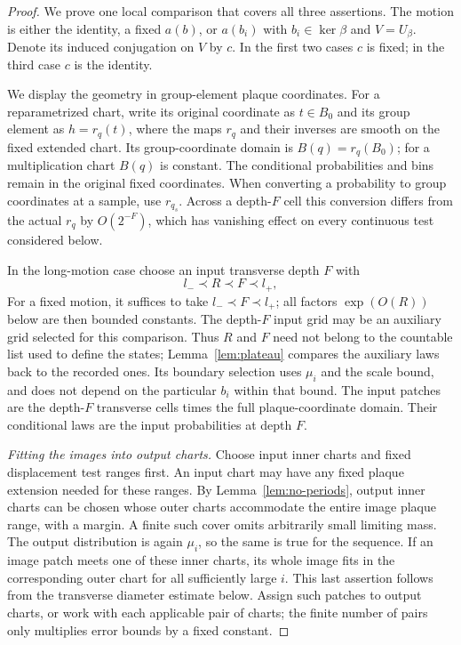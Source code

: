 \begin{proof}
We prove one local comparison that covers all three assertions. The
motion is either the identity, a fixed $a(b)$, or $a(b_i)$ with
$b_i\in\ker\beta$ and $V=U_\beta$. Denote its induced conjugation on
$V$ by $c$. In the first two cases $c$ is fixed; in the third case
$c$ is the identity.

We display the geometry in group-element plaque coordinates. For
a reparametrized chart, write its original coordinate as $t\in B_0$
and its group element as $h=r_q(t)$, where the maps $r_q$ and their
inverses are smooth on the fixed extended chart. Its group-coordinate
domain is $B(q)=r_q(B_0)$; for a multiplication chart $B(q)$ is
constant. The conditional probabilities and bins remain in the
original fixed coordinates. When converting a probability to group
coordinates at a sample, use $r_{q_s}$. Across a depth-$F$ cell this
conversion differs from the actual $r_q$ by $O(2^{-F})$, which has
vanishing effect on every continuous test considered below.

In the long-motion case choose an input
transverse depth $F$ with
\begin{equation}\label{eq:comparison-scales}
 l_-\prec R\prec F\prec l_+,
\end{equation}
For a fixed motion, it suffices to take $l_-\prec F\prec l_+$;
all factors $\exp(O(R))$ below are then bounded constants.
The depth-$F$ input grid may be an auxiliary grid selected for this
comparison. Thus $R$ and $F$ need not belong to the countable list
used to define the states; Lemma~\ref{lem:plateau} compares the
auxiliary laws back to the recorded ones. Its boundary selection
uses $\mu_i$ and the scale bound, and does not depend on the
particular $b_i$ within that bound.
The input patches are the depth-$F$ transverse cells times the full
plaque-coordinate domain. Their conditional laws are the input
probabilities at depth $F$.

\smallskip\noindent
\emph{Fitting the images into output charts.}
Choose input inner charts and fixed displacement test ranges first.
An input chart may have any fixed plaque extension needed for these
ranges. By Lemma~\ref{lem:no-periods}, output inner charts can be
chosen whose outer charts accommodate the entire image plaque
range, with a margin. A finite such cover omits arbitrarily small
limiting mass. The output distribution is again $\mu_i$, so the
same is true for the sequence. If an image patch meets one of these
inner charts, its whole image fits in the corresponding outer chart
for all sufficiently large $i$. This last assertion follows from
the transverse diameter estimate below. Assign such patches to
output charts, or work with each applicable pair of charts; the
finite number of pairs only multiplies error bounds by a fixed
constant.


\end{proof}

